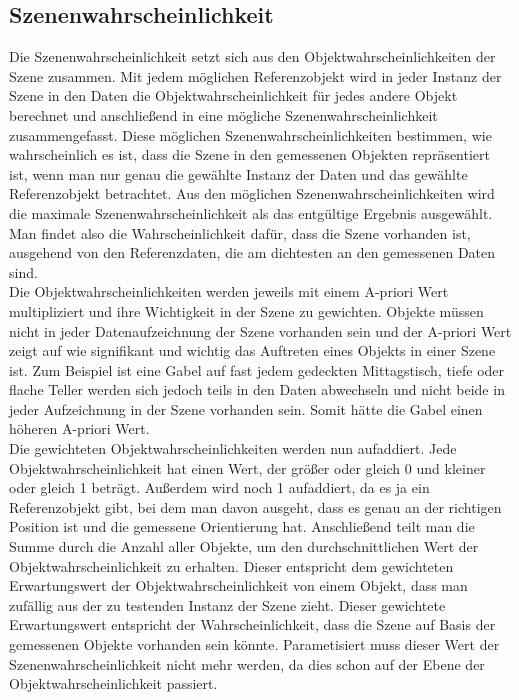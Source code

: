 \subsection{Szenenwahrscheinlichkeit}
Die Szenenwahrscheinlichkeit setzt sich aus den Objektwahrscheinlichkeiten der Szene zusammen. Mit jedem möglichen Referenzobjekt wird in jeder Instanz der Szene in den Daten die Objektwahrscheinlichkeit für jedes andere Objekt berechnet und anschließend in eine mögliche Szenenwahrscheinlichkeit zusammengefasst. Diese möglichen Szenenwahrscheinlichkeiten bestimmen, wie wahrscheinlich es ist, dass die Szene in den gemessenen Objekten repräsentiert ist, wenn man nur genau die gewählte Instanz der Daten und das gewählte Referenzobjekt betrachtet. Aus den möglichen Szenenwahrscheinlichkeiten wird die maximale Szenenwahrscheinlichkeit als das entgültige Ergebnis ausgewählt. Man findet also die Wahrscheinlichkeit dafür, dass die Szene vorhanden ist, ausgehend von den Referenzdaten, die am dichtesten an den gemessenen Daten sind.\smallskip\\
Die Objektwahrscheinlichkeiten werden jeweils mit einem A-priori Wert multipliziert und ihre Wichtigkeit in der Szene zu gewichten. Objekte müssen nicht in jeder Datenaufzeichnung der Szene vorhanden sein und der A-priori Wert zeigt auf wie signifikant und wichtig das Auftreten eines Objekts in einer Szene ist. Zum Beispiel ist eine Gabel auf fast jedem gedeckten Mittagstisch, tiefe oder flache Teller werden sich jedoch teils in den Daten abwechseln und nicht beide in jeder Aufzeichnung in der Szene vorhanden sein. Somit hätte die Gabel einen höheren A-priori Wert. \smallskip\\
Die gewichteten Objektwahrscheinlichkeiten werden nun aufaddiert. Jede Objektwahrscheinlichkeit hat einen Wert, der größer oder gleich 0 und kleiner oder gleich 1 beträgt. Außerdem wird noch 1 aufaddiert, da es ja ein Referenzobjekt gibt, bei dem man davon ausgeht, dass es genau an der richtigen Position ist und die gemessene Orientierung hat. Anschließend teilt man die Summe durch die Anzahl aller Objekte, um den durchschnittlichen Wert der Objektwahrscheinlichkeit zu erhalten. Dieser entspricht dem gewichteten Erwartungswert der Objektwahrscheinlichkeit von einem Objekt, dass man zufällig aus der zu testenden Instanz der Szene zieht. Dieser gewichtete Erwartungswert entspricht der Wahrscheinlichkeit, dass die Szene auf Basis der gemessenen Objekte vorhanden sein könnte. Parametisiert muss dieser Wert der Szenenwahrscheinlichkeit nicht mehr werden, da dies schon auf der Ebene der Objektwahrscheinlichkeit passiert.\cite{kaam72}\smallskip\\
